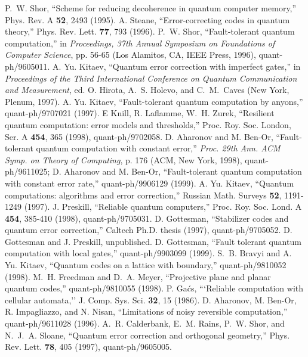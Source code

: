 \begin{references}
 P.~W. Shor, ``Scheme for reducing decoherence in quantum computer memory,'' Phys. Rev. A {\bf 52}, 2493 (1995).
 A. Steane, ``Error-correcting codes in quantum theory,'' Phys. Rev. Lett. {\bf 77}, 793 (1996).
 P.~W. Shor, ``Fault-tolerant quantum computation,'' in {\it Proceedings, 37th Annual Symposium on Foundations of Computer Science}, pp. 56-65 (Los Alamitos, CA, IEEE Press, 1996), quant-ph/9605011.
 A. Yu. Kitaev, ``Quantum error correction with imperfect gates,'' in {\it Proceedings of the Third International Conference on Quantum Communication and Measurement}, ed. O. Hirota, A.~S. Holevo, and C.~M.~Caves (New York, Plenum, 1997).
 A. Yu. Kitaev, ``Fault-tolerant quantum computation by anyons,'' quant-ph/9707021 (1997).
 E Knill, R. Laflamme, W.~H. Zurek, ``Resilient quantum computation: error models and thresholds,'' Proc. Roy. Soc. London, Ser. A {\bf 454}, 365 (1998), quant-ph/9702058.
 D. Aharonov and M. Ben-Or, ``Fault-tolerant quantum computation with constant error,'' {\it Proc. 29th Ann. ACM Symp. on Theory of Computing}, p. 176 (ACM, New York, 1998), quant-ph/9611025; D. Aharonov and M. Ben-Or, ``Fault-tolerant quantum computation with constant error rate,'' quant-ph/9906129 (1999).
 A. Yu. Kitaev, ``Quantum computations: algorithms and error correction,'' Russian Math. Surveys {\bf 52}, 1191-1249 (1997).
 J. Preskill, ``Reliable quantum computers,''  Proc. Roy. Soc. Lond. A {\bf 454}, 385-410 (1998), quant-ph/9705031. 
 D. Gottesman, ``Stabilizer codes and quantum error correction,'' Caltech Ph.D. thesis (1997), quant-ph/9705052.
 D. Gottesman and J. Preskill, unpublished.
 D. Gottesman, ``Fault tolerant quantum computation with local gates,'' quant-ph/9903099 (1999).
 S.~B. Bravyi and A. Yu. Kitaev, ``Quantum codes on a lattice with boundary,'' quant-ph/9810052 (1998).
 M.~H. Freedman and D.~A. Meyer, ``Projective plane and planar quantum codes,'' quant-ph/9810055 (1998).
 P. Ga\'cs, ```Reliable computation with cellular automata,'' J.
Comp. Sys. Sci. {\bf 32}, 15 (1986).
 D. Aharonov, M. Ben-Or, R. Impagliazzo, and N. Nisan, ``Limitations of noisy reversible computation,'' quant-ph/9611028 (1996).
 A.~R. Calderbank, E.~M. Rains, P.~W. Shor, and N.~J.~A. Sloane, ``Quantum error correction and orthogonal geometry,'' Phys. Rev. Lett. {\bf 78}, 405 (1997), quant-ph/9605005. 

\end{references}
